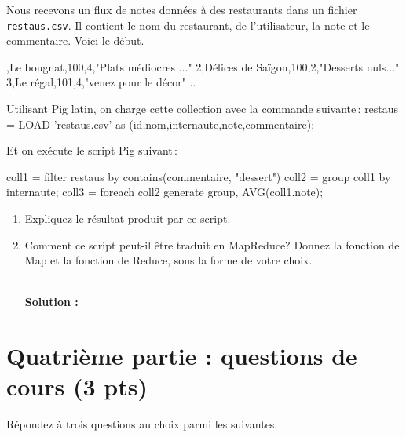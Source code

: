 \documentclass[10pt,a4paper]{article}
\newenvironment{smallverbatim}%
{\endgraf\small\verbatim}{\endverbatim}
\newenvironment{solution}[0]{
~\\ \color{red} \textbf{Solution : }\color{black}}{%
}
\begin{document}
Nous recevons un flux de notes données à des restaurants dans
un fichier \texttt{restaus.csv}. Il contient le nom du restaurant,
de l'utilisateur, la note et le commentaire. Voici le début.

\begin{smallverbatim}
1,Le bougnat,100,4,"Plats médiocres ..."
2,Délices de Saïgon,100,2,"Desserts nuls..."
3,Le régal,101,4,"venez pour le décor"
..
\end{smallverbatim}

Utilisant Pig latin, on charge cette collection avec la commande suivante\,:
\begin{smallverbatim}
restaus = LOAD 'restaus.csv' as (id,nom,internaute,note,commentaire);
\end{smallverbatim}

Et on exécute le script Pig suivant\,:

\begin{smallverbatim}
coll1 = filter restaus by contains(commentaire, "dessert")
coll2 = group coll1 by internaute;
coll3  = foreach coll2 generate group, AVG(coll1.note);
\end{smallverbatim} 

\begin{enumerate}
 \item Expliquez le résultat produit par ce script.
 \item Comment ce script peut-il être traduit en MapReduce? Donnez la fonction
    de Map et la fonction de Reduce, sous la forme de votre choix.

\begin{solution}

\end{solution}

\end{enumerate}

\section*{Quatrième partie : questions de cours (3 pts)}

Répondez à trois questions au choix parmi les suivantes.
\end{document}
